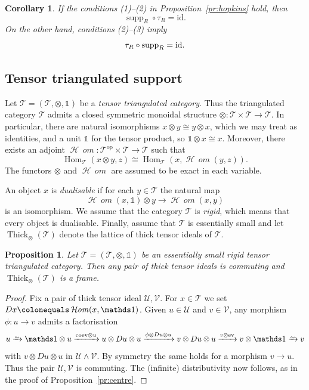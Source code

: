 \documentclass{amsart}[a4]
\newtheorem{corollary}[theorem]{Corollary}
\newtheorem{proposition}[theorem]{Proposition}
\theoremstyle{definition}
\theoremstyle{remark}
\numberwithin{equation}{section}
\newcommand{\Hom}{\operatorname{Hom}}
\newcommand{\fHom}{\operatorname{\mathcal{H}\!\!\;\mathit{om}}}
\newcommand{\supp}{\operatorname{supp}}
\newcommand{\Thick}{\operatorname{Thick}}
\newcommand{\iso}{\xrightarrow{\raisebox{-.6ex}[0ex][0ex]{$\scriptstyle{\sim}$}}}
\newcommand{\id}{\mathrm{id}}
\newcommand{\op}{\mathrm{op}}
\newcommand{\cat}{\mathcal}
\newcommand{\one}{\mathds 1}
\begin{document}
\begin{corollary}\label{co:hopkins}
\pushQED{\qed}  If the conditions \emph{(1)--(2)} in
Proposition~\ref{pr:hopkins} hold, then \[{\supp_R}\circ\tau_R=\id.\]
On the other hand, conditions \emph{(2)--(3)} imply
\[\tau_R\circ{\supp_R}=\id.\qedhere\]
\end{corollary}


\subsection*{Tensor triangulated support}


Let $\cat T= (\cat T,\otimes,\one)$ be a \emph{tensor triangulated
  category}. Thus the triangulated category $\cat T$ admits a closed
symmetric monoidal structure
$\otimes\colon\cat T\times\cat T\to\cat T$. In particular, there are
natural isomorphisms $x\otimes y\cong y\otimes x$, which we may treat
as identities, and a unit $\one$ for the tensor product, so
$\one\otimes x\cong x$.  Moreover, there exists an adjoint
$\fHom\colon \cat T^\op\times\cat T\to \cat T$ such that
\begin{equation}\label{eq:function-obj}
  \Hom_\cat T(x\otimes y,z)\cong\Hom_\cat T(x,\fHom(y,z)).
\end{equation}
The functors $\otimes$ and $\fHom$ are assumed to be exact in each
variable.

An object $x$ is \emph{dualisable} if for each
$y\in\cat T $ the natural map
\[
\fHom(x,\one)\otimes y\longrightarrow \fHom(x,y)
\]
is an isomorphism. We assume that the category $\cat T$ is
\emph{rigid}, which means that every object is dualisable. Finally,
assume that $\cat T$ is essentially small and let
$\Thick_\otimes(\cat T)$ denote the lattice of thick tensor ideals of
$\cat T$.

\begin{proposition}\label{pr:tensor-central}
  Let $\cat T=(\cat T,\otimes,\one) $ be an essentially small rigid tensor triangulated
  category.  Then any pair of thick tensor ideals is commuting and
  $\Thick_\otimes(\cat T)$ is a frame.
\end{proposition}
\begin{proof}
  Fix a pair of thick tensor ideal $\cat U,\cat V$.  For $x\in\cat T$
  we set $Dx\colonequals\fHom(x,\one)$.  Given $u\in\cat U$ and $v\in\cat V$, any
  morphism $\phi\colon u\to v$ admits a factorisation
  \[u\iso \one\otimes u\xrightarrow{\text{coev}\otimes u} u\otimes
    Du\otimes u\xrightarrow{\phi\otimes Du\otimes u} v\otimes
    Du\otimes u\xrightarrow{v\otimes\text{ev}} v\otimes\one\iso v\]
  with $v\otimes Du\otimes u$ in $\cat U\wedge\cat V$.  By symmetry
  the same holds for a morphism $v\to u$. Thus the pair
  $\cat U,\cat V$ is commuting.  The (infinite) distributivity now
  follows, as in the proof of Proposition~\ref{pr:centre}.
\end{proof}
\end{document}
